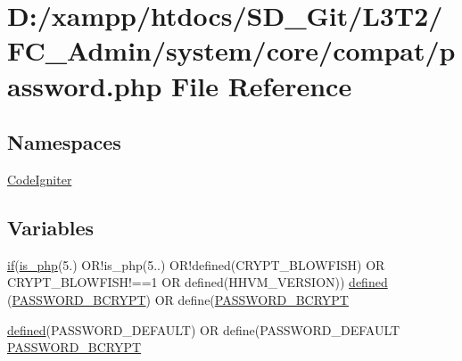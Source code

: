 \hypertarget{_admin_2system_2core_2compat_2password_8php}{}\section{D\+:/xampp/htdocs/\+S\+D\+\_\+\+Git/\+L3\+T2/\+F\+C\+\_\+\+Admin/system/core/compat/password.php File Reference}
\label{_admin_2system_2core_2compat_2password_8php}
\subsection*{Namespaces}
\begin{DoxyCompactItemize}
\item 
 \hyperlink{namespace_code_igniter}{Code\+Igniter}
\end{DoxyCompactItemize}
\subsection*{Variables}
\begin{DoxyCompactItemize}
\item 
\hyperlink{_admin_2assets_2js_2bootstrap_8min_8js_a87cf461060832b8b68a7b48d9e371e4f}{if}(\hyperlink{_admin_2tests_2_bootstrap_8php_acbea7ca989439eea4c6019ad3c5161aa}{is\+\_\+php}(\textquotesingle{}5.\textquotesingle{}) O\+R!is\+\_\+php(\textquotesingle{}5..\textquotesingle{}) O\+R!defined(\textquotesingle{}C\+R\+Y\+P\+T\+\_\+\+B\+L\+O\+W\+F\+I\+S\+H\textquotesingle{}) O\+R C\+R\+Y\+P\+T\+\_\+\+B\+L\+O\+W\+F\+I\+S\+H!==1 O\+R defined(\textquotesingle{}H\+H\+V\+M\+\_\+\+V\+E\+R\+S\+I\+O\+N\textquotesingle{})) \hyperlink{_admin_2system_2core_2compat_2password_8php_aabb8e1f89683202c71f81779040eb22f}{defined} (\textquotesingle{}\hyperlink{_admin_2system_2core_2compat_2password_8php_a71c35e51b9c76d5ecb437d588ab8f046}{P\+A\+S\+S\+W\+O\+R\+D\+\_\+\+B\+C\+R\+Y\+P\+T}\textquotesingle{}) O\+R define(\textquotesingle{}\hyperlink{_admin_2system_2core_2compat_2password_8php_a71c35e51b9c76d5ecb437d588ab8f046}{P\+A\+S\+S\+W\+O\+R\+D\+\_\+\+B\+C\+R\+Y\+P\+T}\textquotesingle{}
\item 
\hyperlink{_admin_2tests_2_bootstrap_8php_a46458e8654a714e0565e20f63021add9}{defined}(\textquotesingle{}P\+A\+S\+S\+W\+O\+R\+D\+\_\+\+D\+E\+F\+A\+U\+L\+T\textquotesingle{}) O\+R define(\textquotesingle{}P\+A\+S\+S\+W\+O\+R\+D\+\_\+\+D\+E\+F\+A\+U\+L\+T\textquotesingle{} \hyperlink{_admin_2system_2core_2compat_2password_8php_a71c35e51b9c76d5ecb437d588ab8f046}{P\+A\+S\+S\+W\+O\+R\+D\+\_\+\+B\+C\+R\+Y\+P\+T}
\end{DoxyCompactItemize}


